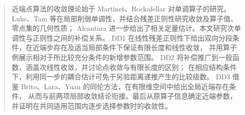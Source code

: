 \begin{abstract}
近端点算法的收敛理论始于 Martinet、Rockafellar 对单调算子的研究。
Luke、Tam 等在局部削弱单调性，并结合残差正则性研究收敛及算子值、零点集的几何性质；
Alcantara 进一步给出了相关定量估计。本文研究次单调性与正则性之间的补偿关系。
DD1 在线性残差正则性下给出双向分段条件，在近端步存在及适当局部条件下保证有限长度和线性收敛，
并用算子例展示相对于所比较充分条件的新增参数范围。
DD2 将补偿推广到一般函数，涵盖次线性收敛，并讨论点收敛与有限长度的区别；
在相应结构条件下，利用同一步的耦合估计可免于另验距离递推产生的比较级数。
DD3 借鉴 Brito、Lara、Yuan 的同伦方法，在有限维空间中给出全局近端存在条件，
从而与前两项局部收敛结论衔接。最后从原算子信息确定近端参数，
并证明在共同适用范围内逐步选择参数时的收敛性。
\end{abstract}
